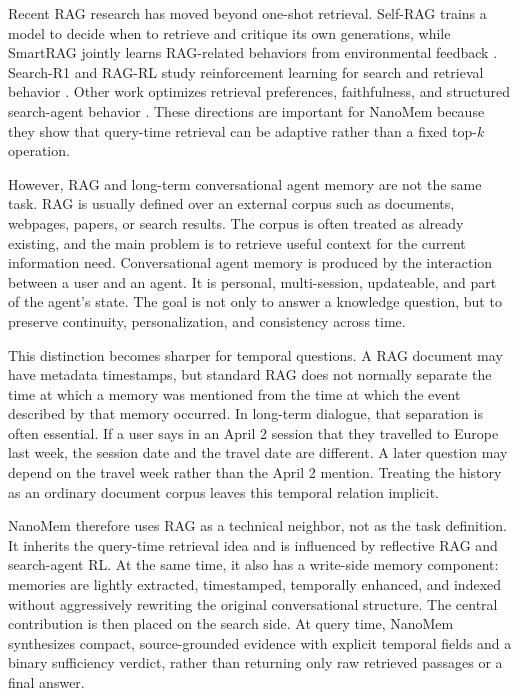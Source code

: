 Recent RAG research has moved beyond one-shot retrieval. Self-RAG trains a
model to decide when to retrieve and critique its own generations, while
SmartRAG jointly learns RAG-related behaviors from environmental feedback
\cite{asai2024selfrag,gao2025smartrag}. Search-R1 and RAG-RL study
reinforcement learning for search and retrieval behavior
\cite{jin2025searchr1,huang2025ragrl}. Other work optimizes retrieval
preferences, faithfulness, and structured search-agent behavior
\cite{yan2025rpo,tang2025ssfo,ji2026treegrpo,zhu2025stratifiedgrpo}. These
directions are important for NanoMem because they show that query-time
retrieval can be adaptive rather than a fixed top-$k$ operation.

However, RAG and long-term conversational agent memory are not the same task.
RAG is usually defined over an external corpus such as documents, webpages,
papers, or search results. The corpus is often treated as already existing, and
the main problem is to retrieve useful context for the current information
need. Conversational agent memory is produced by the interaction between a user
and an agent. It is personal, multi-session, updateable, and part of the agent's
state. The goal is not only to answer a knowledge question, but to preserve
continuity, personalization, and consistency across time.

This distinction becomes sharper for temporal questions. A RAG document may
have metadata timestamps, but standard RAG does not normally separate the time
at which a memory was mentioned from the time at which the event described by
that memory occurred. In long-term dialogue, that separation is often essential.
If a user says in an April 2 session that they travelled to Europe last week,
the session date and the travel date are different. A later question may depend
on the travel week rather than the April 2 mention. Treating the history as an
ordinary document corpus leaves this temporal relation implicit.

NanoMem therefore uses RAG as a technical neighbor, not as the task definition.
It inherits the query-time retrieval idea and is influenced by reflective RAG
and search-agent RL. At the same time, it also has a write-side memory
component: memories are lightly extracted, timestamped, temporally enhanced, and
indexed without aggressively rewriting the original conversational structure.
The central contribution is then placed on the search side. At query time,
NanoMem synthesizes compact, source-grounded evidence with explicit temporal
fields and a binary sufficiency verdict, rather than returning only raw
retrieved passages or a final answer.

